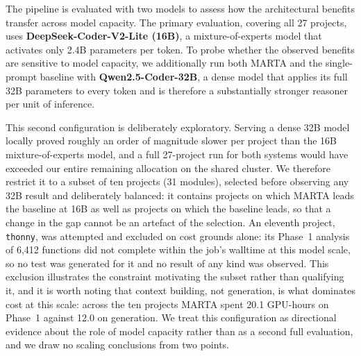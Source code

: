 The pipeline is evaluated with two models to assess how the architectural benefits
transfer across model capacity. The primary evaluation, covering all 27 projects, uses
\textbf{DeepSeek-Coder-V2-Lite (16B)}, a mixture-of-experts model that activates only
2.4B parameters per token. To probe whether the observed benefits are sensitive to
model capacity, we additionally run both MARTA and the single-prompt baseline with
\textbf{Qwen2.5-Coder-32B}, a dense model that applies its full 32B parameters to every
token and is therefore a substantially stronger reasoner per unit of inference.

This second configuration is deliberately exploratory. Serving a dense 32B model
locally proved roughly an order of magnitude slower per project than the 16B
mixture-of-experts model, and a full 27-project run for both systems would have
exceeded our entire remaining allocation on the shared cluster. We therefore restrict
it to a subset of ten projects (31 modules), selected before observing any 32B result
and deliberately balanced: it contains projects on which MARTA leads the baseline at
16B as well as projects on which the baseline leads, so that a change in the gap cannot
be an artefact of the selection. An eleventh project, \texttt{thonny}, was attempted
and excluded on cost grounds alone: its Phase~1 analysis of 6{,}412 functions did not
complete within the job's walltime at this model scale, so no test was generated for it
and no result of any kind was observed. This exclusion illustrates the constraint
motivating the subset rather than qualifying it, and it is worth noting that context
building, not generation, is what dominates cost at this scale: across the ten projects
MARTA spent 20.1 GPU-hours on Phase~1 against 12.0 on generation. We treat this
configuration as directional evidence about the role of model capacity rather than as a
second full evaluation, and we draw no scaling conclusions from two points.

